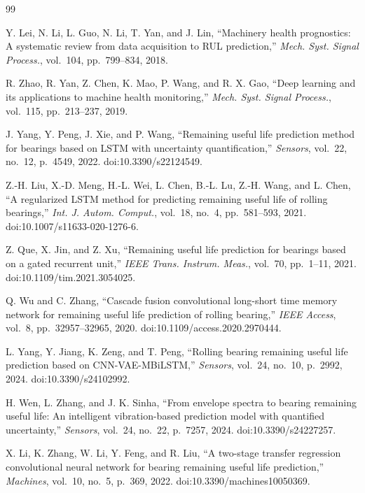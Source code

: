 \documentclass[pdflatex,sn-mathphys-num]{sn-jnl}
\begin{document}
\begin{thebibliography}{99}

Y. Lei, N. Li, L. Guo, N. Li, T. Yan, and J. Lin,
``Machinery health prognostics: A systematic review from data acquisition to RUL prediction,''
\textit{Mech. Syst. Signal Process.}, vol.~104, pp.~799--834, 2018.

R. Zhao, R. Yan, Z. Chen, K. Mao, P. Wang, and R. X. Gao,
``Deep learning and its applications to machine health monitoring,''
\textit{Mech. Syst. Signal Process.}, vol.~115, pp.~213--237, 2019.

J. Yang, Y. Peng, J. Xie, and P. Wang,
``Remaining useful life prediction method for bearings based on LSTM with uncertainty quantification,''
\textit{Sensors}, vol.~22, no.~12, p.~4549, 2022. doi:10.3390/s22124549.

Z.-H. Liu, X.-D. Meng, H.-L. Wei, L. Chen, B.-L. Lu, Z.-H. Wang, and L. Chen,
``A regularized LSTM method for predicting remaining useful life of rolling bearings,''
\textit{Int. J. Autom. Comput.}, vol.~18, no.~4, pp.~581--593, 2021. doi:10.1007/s11633-020-1276-6.

Z. Que, X. Jin, and Z. Xu,
``Remaining useful life prediction for bearings based on a gated recurrent unit,''
\textit{IEEE Trans. Instrum. Meas.}, vol.~70, pp.~1--11, 2021. doi:10.1109/tim.2021.3054025.

Q. Wu and C. Zhang,
``Cascade fusion convolutional long-short time memory network for remaining useful life prediction of rolling bearing,''
\textit{IEEE Access}, vol.~8, pp.~32957--32965, 2020. doi:10.1109/access.2020.2970444.

L. Yang, Y. Jiang, K. Zeng, and T. Peng,
``Rolling bearing remaining useful life prediction based on CNN-VAE-MBiLSTM,''
\textit{Sensors}, vol.~24, no.~10, p.~2992, 2024. doi:10.3390/s24102992.

H. Wen, L. Zhang, and J. K. Sinha,
``From envelope spectra to bearing remaining useful life: An intelligent vibration-based prediction model with quantified uncertainty,''
\textit{Sensors}, vol.~24, no.~22, p.~7257, 2024. doi:10.3390/s24227257.

X. Li, K. Zhang, W. Li, Y. Feng, and R. Liu,
``A two-stage transfer regression convolutional neural network for bearing remaining useful life prediction,''
\textit{Machines}, vol.~10, no.~5, p.~369, 2022. doi:10.3390/machines10050369.


\end{thebibliography}
\end{document}
